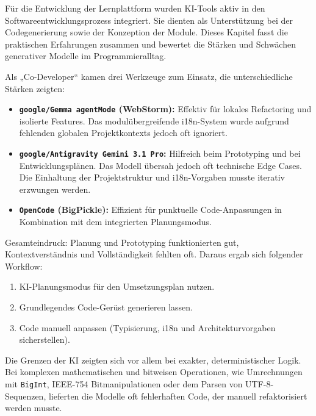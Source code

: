 \label{3_3_KI}

Für die Entwicklung der Lernplattform wurden KI-Tools aktiv in den Softwareentwicklungsprozess integriert. Sie dienten als Unterstützung bei der Codegenerierung sowie der Konzeption der Module. Dieses Kapitel fasst die praktischen Erfahrungen zusammen und bewertet die Stärken und Schwächen generativer Modelle im Programmieralltag.


Als „Co-Developer“ kamen drei Werkzeuge zum Einsatz, die unterschiedliche Stärken zeigten:

\begin{itemize}
  \item \textbf{\texttt{google/Gemma agentMode} (WebStorm):} Effektiv für lokales Refactoring und isolierte Features. Das modulübergreifende i18n-System wurde aufgrund fehlenden globalen Projektkontexts jedoch oft ignoriert.
  \item \textbf{\texttt{google/Antigravity Gemini 3.1 Pro}:} Hilfreich beim Prototyping und bei Entwicklungsplänen. Das Modell übersah jedoch oft technische Edge Cases. Die Einhaltung der Projektstruktur und i18n-Vorgaben musste iterativ erzwungen werden.
  \item \textbf{\texttt{OpenCode} (BigPickle):} Effizient für punktuelle Code-Anpassungen in Kombination mit dem integrierten Planungsmodus.
\end{itemize}

Gesamteindruck: Planung und Prototyping funktionierten gut, Kontextverständnis und Vollständigkeit fehlten oft. Daraus ergab sich folgender Workflow:
\begin{enumerate}
  \item KI-Planungsmodus für den Umsetzungsplan nutzen.
  \item Grundlegendes Code-Gerüst generieren lassen.
  \item Code manuell anpassen (Typisierung, i18n und Architekturvorgaben sicherstellen).
\end{enumerate}


Die Grenzen der KI zeigten sich vor allem bei exakter, deterministischer Logik. Bei komplexen mathematischen und bitweisen Operationen, wie Umrechnungen mit \texttt{BigInt}, IEEE-754 Bitmanipulationen oder dem Parsen von UTF-8-Sequenzen, lieferten die Modelle oft fehlerhaften Code, der manuell refaktorisiert werden musste.

